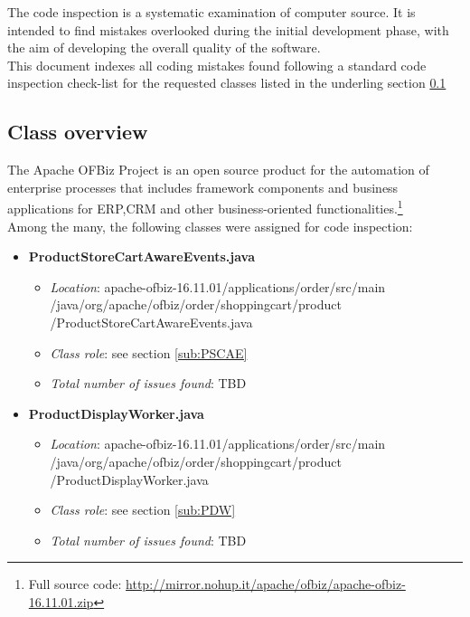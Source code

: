 The code inspection is a systematic examination of computer source. It is intended to find mistakes overlooked during the initial development phase, with the aim of developing the overall quality of the software.\\
This document indexes all coding mistakes found following a standard code inspection check-list for the requested classes listed in the underling section \ref{sub:Elenco}\\
\subsection{Class overview}
\label{sub:Elenco}
The Apache OFBiz Project is an open source product for the automation of enterprise processes that includes framework components and business applications for ERP,CRM and other business-oriented functionalities.\footnote{Full source code: \url{http://mirror.nohup.it/apache/ofbiz/apache-ofbiz-16.11.01.zip}}\\
Among the many, the following classes were assigned for code inspection: 
\begin{itemize}
\item \textbf{ProductStoreCartAwareEvents.java}
\begin{itemize}
\item \textit{Location}: apache-ofbiz-16.11.01/applications/order/src/main\\/java/org/apache/ofbiz/order/shoppingcart/product\\/ProductStoreCartAwareEvents.java
\item \textit{Class role}: see section \ref{sub:PSCAE}
\item \textit{Total number of issues found}: TBD
\end{itemize}
\item \textbf{ProductDisplayWorker.java}
\begin{itemize}
\item \textit{Location}: apache-ofbiz-16.11.01/applications/order/src/main\\/java/org/apache/ofbiz/order/shoppingcart/product\\/ProductDisplayWorker.java
\item \textit{Class role}: see section \ref{sub:PDW}
\item \textit{Total number of issues found}: TBD
\end{itemize}
\end{itemize}
